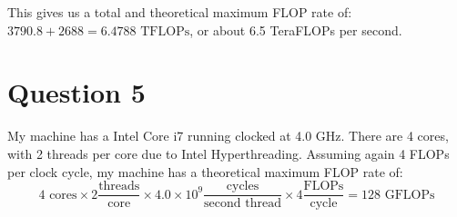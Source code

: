 \documentclass[11pt]{article}
\begin{document}
        This gives us a total and theoretical maximum FLOP rate of: $3790.8 + 2688 = 6.4788 \text{ TFLOPs}$, or about 6.5 TeraFLOPs per second.

    \section*{Question 5}
        My machine has a Intel Core i7 running clocked at 4.0 GHz. There are 4 cores, with 2 threads per core due to Intel Hyperthreading. Assuming again 4 FLOPs per clock cycle, my machine has a theoretical maximum FLOP rate of:
        \begin{equation*}
            4 \text{ cores} \times 2 \frac{\text{threads}}{\text{core}} \times 4.0\times 10^9 \frac{\text{cycles}}{\text{second thread}} \times 4 \frac{\text{FLOPs}}{\text{cycle}} = 128 \text{ GFLOPs}
        \end{equation*}
\end{document}
